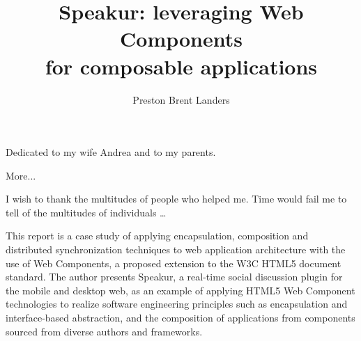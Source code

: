 \documentclass[12pt]{report}	%
\author{Preston Brent Landers}  	%
\title{Speakur: leveraging Web Components \\ for composable applications}
\theoremstyle{definition}
\theoremstyle{remark}
\begin{document}
\copyrightpage          %


%
%
%
\commcertpage           %

\titlepage              %



%
\begin{dedication}
%
Dedicated to my wife Andrea and to my parents.

More...
\end{dedication}


\begin{acknowledgments}		%
%
I wish to thank the multitudes of people who helped me. Time would
fail me to tell of the multitudes of individuals \ldots
\end{acknowledgments}


%
\utabstract
{}%
\indent

This report is a case study of applying encapsulation, composition and distributed synchronization techniques to web application architecture with the use of Web Components, 
a proposed extension to the W3C HTML5 document standard. 
The author presents Speakur, a real-time social discussion plugin for the mobile and desktop web, 
as an example of applying HTML5 Web Component technologies to realize software engineering principles such as encapsulation and interface-based abstraction, and the composition of applications from components sourced from diverse authors and frameworks.
\end{document}
